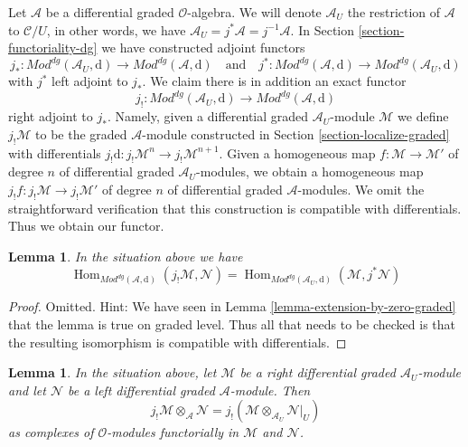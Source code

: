 \documentclass{stacks-project}
\theoremstyle{plain}
\newtheorem{lemma}[subsection]{Lemma}
\theoremstyle{definition}
\theoremstyle{remark}
\numberwithin{equation}{subsection}
\def\Hom{\mathop{\mathrm{Hom}}\nolimits}
\begin{document}
\medskip\noindent
Let $\mathcal{A}$ be a differential graded $\mathcal{O}$-algebra.
We will denote $\mathcal{A}_U$ the restriction of $\mathcal{A}$
to $\mathcal{C}/U$, in other words, we have
$\mathcal{A}_U = j^*\mathcal{A} = j^{-1}\mathcal{A}$.
In Section \ref{section-functoriality-dg}
we have constructed adjoint functors
$$
j_* :
\textit{Mod}^{dg}(\mathcal{A}_U, \text{d})
\longrightarrow
\textit{Mod}^{dg}(\mathcal{A}, \text{d})
\quad\text{and}\quad
j^* :
\textit{Mod}^{dg}(\mathcal{A}, \text{d})
\longrightarrow
\textit{Mod}^{dg}(\mathcal{A}_U, \text{d})
$$
with $j^*$ left adjoint to $j_*$. We claim there is in addition an
exact functor
$$
j_! :
\textit{Mod}^{dg}(\mathcal{A}_U, \text{d})
\longrightarrow
\textit{Mod}^{dg}(\mathcal{A}, \text{d})
$$
right adjoint to $j_*$. Namely, given a differential graded
$\mathcal{A}_U$-module $\mathcal{M}$ we define $j_!\mathcal{M}$
to be the graded $\mathcal{A}$-module constructed in
Section \ref{section-localize-graded}
with differentials
$j_!\text{d} : j_!\mathcal{M}^n \to j_!\mathcal{M}^{n + 1}$.
Given a homogeneous map
$f : \mathcal{M} \to \mathcal{M}'$ of degree $n$ of differential graded
$\mathcal{A}_U$-modules, we obtain a homogeneous map
$j_!f : j_!\mathcal{M} \to j_!\mathcal{M}'$ of degree $n$
of differential graded $\mathcal{A}$-modules. We omit the
straightforward verification
that this construction is compatible with differentials.
Thus we obtain our functor.

\begin{lemma}
\label{lemma-extension-by-zero-dg}
In the situation above we have
$$
\Hom_{\textit{Mod}^{dg}(\mathcal{A}, \text{d})}(
j_!\mathcal{M}, \mathcal{N}) =
\Hom_{\textit{Mod}^{dg}(\mathcal{A}_U, \text{d})}(
\mathcal{M}, j^*\mathcal{N})
$$
\end{lemma}

\begin{proof}
Omitted. Hint: We have seen in Lemma \ref{lemma-extension-by-zero-graded}
that the lemma is true on graded level. Thus all that needs to be
checked is that the resulting isomorphism is compatible with differentials.
\end{proof}

\begin{lemma}
\label{lemma-tensor-with-extension-by-zero-dg}
In the situation above, let $\mathcal{M}$ be a right differential graded
$\mathcal{A}_U$-module and let $\mathcal{N}$ be a left differential graded
$\mathcal{A}$-module. Then
$$
j_!\mathcal{M} \otimes_\mathcal{A} \mathcal{N} =
j_!(\mathcal{M} \otimes_{\mathcal{A}_U} \mathcal{N}|_U)
$$
as complexes of $\mathcal{O}$-modules
functorially in $\mathcal{M}$ and $\mathcal{N}$.
\end{lemma}
\end{document}
